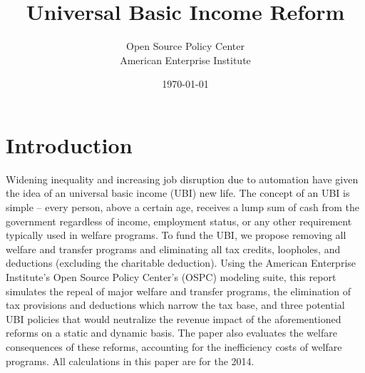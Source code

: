 \documentclass{article}
\begin{document}
\begin{titlepage}

\title{Universal Basic Income Reform}
\author{Open Source Policy Center \\ American Enterprise Institute}
\date{\today}

\maketitle

\end{titlepage}

\tableofcontents
\newpage

\doublespacing

\section{Introduction}

Widening inequality and increasing job disruption due to automation have given the idea of an universal basic income (UBI) new life. The concept of an UBI is simple -- every person, above a certain age, receives a lump sum of cash from the government regardless of income, employment status, or any other requirement typically used in welfare programs. To fund the UBI, we propose removing all welfare and transfer programs and eliminating all tax credits, loopholes, and deductions (excluding the charitable deduction). Using the American Enterprise Institute's Open Source Policy Center's (OSPC) modeling suite, this report simulates the repeal of major welfare and transfer programs, the elimination of tax provisions and deductions which narrow the tax base, and three potential UBI policies that would neutralize the revenue impact of the aforementioned reforms on a static and dynamic basis. The paper also evaluates the welfare consequences of these reforms, accounting for the inefficiency costs of welfare programs. All calculations in this paper are for the 2014.
\end{document}
